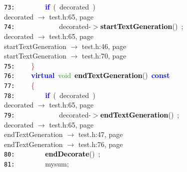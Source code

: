 \documentclass{article}
\begin{document}
\mbox{}\texttt{\textcolor{Black}{73:}} \ \ \ \ \ \ \ \ \textbf{\textcolor{Blue}{if}}\ \textcolor{BrickRed}{(}\ decorated\ \textcolor{BrickRed}{)} \\
\mbox{}{\hfill decorated $\rightarrow$ test.h:65, page~\pageref{test.h:65}} \\
\mbox{}\texttt{\textcolor{Black}{74:}} \ \ \ \ \ \ \ \ \ \ \ \ decorated\textcolor{BrickRed}{-$>$}\textbf{\textcolor{Black}{startTextGeneration}}\textcolor{BrickRed}{()}\ \textcolor{BrickRed}{;} \\
\mbox{}{\hfill decorated $\rightarrow$ test.h:65, page~\pageref{test.h:65}} \\
\mbox{}{\hfill startTextGeneration $\rightarrow$ test.h:46, page~\pageref{test.h:46}} \\
\mbox{}{\hfill startTextGeneration $\rightarrow$ test.h:70, page~\pageref{test.h:70}} \\
\mbox{}\texttt{\textcolor{Black}{75:}} \ \ \ \ \textcolor{Red}{\}} \\
\mbox{}\texttt{\textcolor{Black}{76:}} \ \ \ \ \textbf{\textcolor{Blue}{virtual}}\ \textcolor{ForestGreen}{void}\ \textbf{\textcolor{Black}{\label{test.h:76}endTextGeneration}}\textcolor{BrickRed}{()}\ \textbf{\textcolor{Blue}{const}}\  \\
\mbox{}\texttt{\textcolor{Black}{77:}} \ \ \ \ \textcolor{Red}{\{}\  \\
\mbox{}\texttt{\textcolor{Black}{78:}} \ \ \ \ \ \ \ \ \textbf{\textcolor{Blue}{if}}\ \textcolor{BrickRed}{(}\ decorated\ \textcolor{BrickRed}{)} \\
\mbox{}{\hfill decorated $\rightarrow$ test.h:65, page~\pageref{test.h:65}} \\
\mbox{}\texttt{\textcolor{Black}{79:}} \ \ \ \ \ \ \ \ \ \ \ \ decorated\textcolor{BrickRed}{-$>$}\textbf{\textcolor{Black}{endTextGeneration}}\textcolor{BrickRed}{()}\ \textcolor{BrickRed}{;} \\
\mbox{}{\hfill decorated $\rightarrow$ test.h:65, page~\pageref{test.h:65}} \\
\mbox{}{\hfill endTextGeneration $\rightarrow$ test.h:47, page~\pageref{test.h:47}} \\
\mbox{}{\hfill endTextGeneration $\rightarrow$ test.h:76, page~\pageref{test.h:76}} \\
\mbox{}\texttt{\textcolor{Black}{80:}} \ \ \ \ \ \ \ \ \textbf{\textcolor{Black}{endDecorate}}\textcolor{BrickRed}{()}\ \textcolor{BrickRed}{;} \\
\mbox{}\texttt{\textcolor{Black}{81:}} \ \ \ \ \ \ \ \ mysum\textcolor{BrickRed}{;} \\
\end{document}

